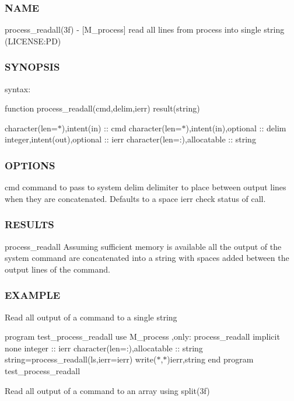 \subsubsection*{N\+A\+ME}

process\+\_\+readall(3f) -\/ \mbox{[}M\+\_\+process\mbox{]} read all lines from process into single string (L\+I\+C\+E\+N\+SE\+:PD) \subsubsection*{S\+Y\+N\+O\+P\+S\+IS}

syntax\+:

function process\+\_\+readall(cmd,delim,ierr) result(string)

character(len=$\ast$),intent(in) \+:\+: cmd character(len=$\ast$),intent(in),optional \+:\+: delim integer,intent(out),optional \+:\+: ierr character(len=\+:),allocatable \+:\+: string \subsubsection*{O\+P\+T\+I\+O\+NS}

cmd command to pass to system delim delimiter to place between output lines when they are concatenated. Defaults to a space ierr check status of call. \subsubsection*{R\+E\+S\+U\+L\+TS}

process\+\_\+readall Assuming sufficient memory is available all the output of the system command are concatenated into a string with spaces added between the output lines of the command. \subsubsection*{E\+X\+A\+M\+P\+LE}

Read all output of a command to a single string

program test\+\_\+process\+\_\+readall use M\+\_\+process ,only\+: process\+\_\+readall implicit none integer \+:\+: ierr character(len=\+:),allocatable \+:\+: string string=process\+\_\+readall(\textquotesingle{}ls\textquotesingle{},ierr=ierr) write($\ast$,$\ast$)ierr,string end program test\+\_\+process\+\_\+readall

Read all output of a command to an array using split(3f)

